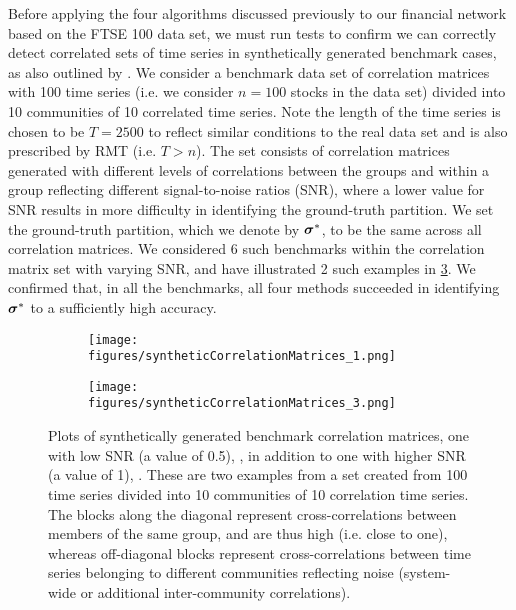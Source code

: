 Before applying the four algorithms discussed previously to our financial network based on the FTSE 100 data set, we must run tests to confirm we can correctly detect correlated sets of time series in synthetically generated benchmark cases, as also outlined by \cite{MG13}.
We consider a benchmark data set of correlation matrices with 100 time series (i.e. we consider $n = 100$ stocks in the data set) divided into 10 communities of 10 correlated time series.
Note the length of the time series is chosen to be $T=2500$ to reflect similar conditions to the real data set and is also prescribed by RMT (i.e. $T>n$).
The set consists of correlation matrices generated with different levels of correlations between the groups and within a group reflecting different signal-to-noise ratios (SNR), where a lower value for SNR results in more difficulty in identifying the ground-truth partition.
We set the ground-truth partition, which we denote by $\vecvar{\sigma}^{*}$, to be the same across all correlation matrices.
We considered 6 such benchmarks within the correlation matrix set with varying SNR, and have illustrated 2 such examples in \cref{fig:benchmarkCorrelationMatrices}.
We confirmed that, in all the benchmarks, all four methods succeeded in identifying $\vecvar{\sigma}^{*}$ to a sufficiently high accuracy.

\begin{figure}
	\centering
	\begin{subfigure}{.5\textwidth}
		\centering
		\texttt{[image: figures/syntheticCorrelationMatrices\_1.png]}
		\caption{}
		\label{fig:benchmarkCorrelationMatrix1}
	\end{subfigure}%
	\begin{subfigure}{.5\textwidth}
		\centering
		\texttt{[image: figures/syntheticCorrelationMatrices\_3.png]}
		\caption{}
		\label{fig:benchmarkCorrelationMatrix3}
	\end{subfigure}
	\caption[Plots of synthetically generated benchmark correlation matrices]{\label{fig:benchmarkCorrelationMatrices} Plots of synthetically generated benchmark correlation matrices, one with low SNR (a value of 0.5), , in addition to one with higher SNR (a value of 1), . These are two examples from a set created from 100 time series divided into 10 communities of 10 correlation time series. The blocks along the diagonal represent cross-correlations between members of the same group, and are thus high (i.e. close to one), whereas off-diagonal blocks represent cross-correlations between time series belonging to different communities reflecting noise (system-wide or additional inter-community correlations).}
\end{figure}

